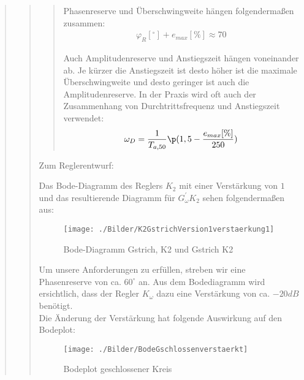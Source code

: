 \begin{quote}
\begin{quote}
\begin{quote}
            
            \vspace{2em}
            Phasenreserve und Überschwingweite hängen folgendermaßen zusammen:\\
            \begin{equation*}
                \begin{split}
                \varphi_R [^\circ] + e_{max} [\%] \approx 70
                \end{split}
            \end{equation*}
            
            \vspace{1em}
            Auch Amplitudenreserve und Anstiegszeit hängen voneinander ab. Je kürzer die Anstiegszeit ist desto
            höher ist die maximale Überschwingweite und desto geringer ist auch die Amplitudenreserve. In
            der Praxis wird oft auch der Zusammenhang von Durchtrittsfrequenz und Anstiegszeit
            verwendet:
            \begin{equation*}
            \begin{split}
                \omega_D = \frac{1}{T_{a,50}} \p (1,5- \frac{e_{max} [\%]}{250})
            \end{split}
            \end{equation*}
            \cite{krachler}
        \end{quote}

		
		Zum Reglerentwurf:\vspace{1em}
		
		Das Bode-Diagramm des Reglers $K_2$ mit einer Verstärkung von $1$ und das resultierende Diagramm für $G_\omega^{'}
		K_2$ sehen folgendermaßen aus:
		\begin{figure}[H]
        \centering
            \texttt{[image: ./Bilder/K2GstrichVersion1verstaerkung1]}
                \caption{Bode-Diagramm Gstrich, K2 und Gstrich K2}
        \end{figure}
    
        Um unsere Anforderungen zu erfüllen, streben wir eine Phasenreserve von ca. $60^{\circ}$ an. Aus dem Bodediagramm
        wird ersichtlich, dass der Regler $K_\omega$ dazu eine Verstärkung von ca. $-20dB$ benötigt.\\
        Die Änderung der Verstärkung hat folgende Auswirkung auf den Bodeplot:
        \begin{figure}[H]
        \centering
            \texttt{[image: ./Bilder/BodeGschlossenverstaerkt]}
                \caption{Bodeplot geschlossener Kreis}
        \end{figure}
        

\end{quote}
\end{quote}
